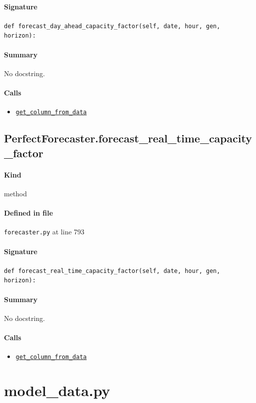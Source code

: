 \documentclass[11pt]{report}
\begin{document}
\paragraph{Signature} \texttt{def forecast\_day\_ahead\_capacity\_factor(self, date, hour, gen, horizon):}
\paragraph{Summary} No docstring.
\paragraph{Calls}
\begin{itemize}[leftmargin=*]
  \item \hyperref[def:forecaster.py:PerfectForecaster.get_column_from_data:L762]{\texttt{get\_column\_from\_data}}
\end{itemize}
\subsection{PerfectForecaster.forecast\_real\_time\_capacity\_factor}
\label{def:forecaster.py:PerfectForecaster.forecast_real_time_capacity_factor:L793}
\paragraph{Kind} method
\paragraph{Defined in file} \texttt{forecaster.py} at line 793
\paragraph{Signature} \texttt{def forecast\_real\_time\_capacity\_factor(self, date, hour, gen, horizon):}
\paragraph{Summary} No docstring.
\paragraph{Calls}
\begin{itemize}[leftmargin=*]
  \item \hyperref[def:forecaster.py:PerfectForecaster.get_column_from_data:L762]{\texttt{get\_column\_from\_data}}
\end{itemize}

\section{model\_data.py}
\label{file:model_data.py}
\end{document}
